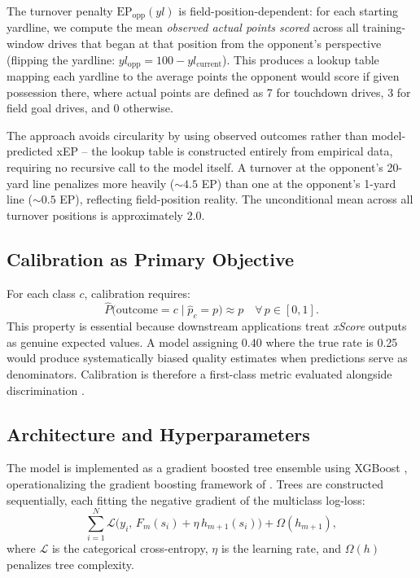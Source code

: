 \documentclass[12pt,a4paper]{article}
\newcommand{\xscore}{\textit{xScore}}
\begin{document}
The turnover penalty $\text{EP}_{\text{opp}}(yl)$ is field-position-dependent: for each starting yardline, we compute the mean \emph{observed actual points scored} across all training-window drives that began at that position from the opponent's perspective (flipping the yardline: $yl_{\text{opp}} = 100 - yl_{\text{current}}$). This produces a lookup table mapping each yardline to the average points the opponent would score if given possession there, where actual points are defined as 7 for touchdown drives, 3 for field goal drives, and 0 otherwise.

The approach avoids circularity by using observed outcomes rather than model-predicted xEP -- the lookup table is constructed entirely from empirical data, requiring no recursive call to the model itself. A turnover at the opponent's 20-yard line penalizes more heavily (${\sim}4.5$ EP) than one at the opponent's 1-yard line (${\sim}0.5$ EP), reflecting field-position reality. The unconditional mean across all turnover positions is approximately 2.0.

\subsection{Calibration as Primary Objective}

For each class $c$, calibration requires:
\begin{equation}
  \hat{P}\!\bigl(\text{outcome} = c \mid \hat{p}_c = p\bigr) \approx p
  \quad \forall\, p \in [0,1].
\end{equation}
This property is essential because downstream applications treat \xscore{} outputs as genuine expected values. A model assigning 0.40 where the true rate is 0.25 would produce systematically biased quality estimates when predictions serve as denominators. Calibration is therefore a first-class metric evaluated alongside discrimination \citep{niculescumizil2005probabilities}.

\subsection{Architecture and Hyperparameters}

The model is implemented as a gradient boosted tree ensemble using XGBoost \citep{chen2016xgboost}, operationalizing the gradient boosting framework of \citet{friedman2001gradientboosting}. Trees are constructed sequentially, each fitting the negative gradient of the multiclass log-loss:
\begin{equation}
  \sum_{i=1}^{N} \mathcal{L}\!\bigl(y_i,\, F_m(s_i) + \eta\, h_{m+1}(s_i)\bigr)
    + \Omega(h_{m+1}),
\end{equation}
where $\mathcal{L}$ is the categorical cross-entropy, $\eta$ is the learning rate, and $\Omega(h)$ penalizes tree complexity.
\end{document}
